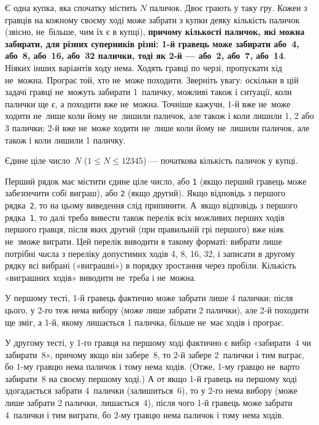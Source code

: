 ﻿Є одна купка, яка спочатку містить $N$ паличок.
Двоє грають у таку гру.
Кожен з гравців на кожному своєму ході може забрати з купки деяку кількість паличок (звісно, не~більше, чим їх є в купці), {\bf причому кількості паличок, які можна забирати, для різних суперників різні: 1-й гравець може забирати або~4, або~8, або~16, або~32 палички, тоді як 2-й --- або~2, або~7, або~14}.
Ніяких інших варіантів ходу нема. 
Ходять гравці по черзі, пропускати хід не~можна.
Програє той, хто не~може походити. Зверніть увагу: оскільки в цій задачі гравці не~можуть забирати 1~паличку, можливі також і ситуації, коли палички ще є, а походити вже не~можна. Точніше кажучи, 1-й вже не~може ходити не~лише коли йому не~лишили паличок, але також і коли лишили 1, 2 або 3 палички; 2-й вже не~може ходити не~лише коли йому не~лишили паличок, але також і коли лишили 1 паличку.

\InputFile
Єдине ціле число~$N$ ($1\leqslant N\leqslant 12345$) --- початкова кількість паличок у купці.

\OutputFile
Перший рядок має містити єдине ціле число, або \texttt{1} (якщо перший гравець може забезпечити собі виграш), або \texttt{2} (якщо др{\it у}гий).
Якщо відповідь з першого рядка~\texttt{2}, то на цьому виведення слід припинити. А~якщо відповідь з першого рядка~\texttt{1}, то далі треба вивести також перелік всіх можливих перших ходів першого гравця, після яких др{\it у}гий (при правильній грі першого) вже ні{\it я}к не~зможе виграти. Цей перелік виводити в такому форматі: вибрати лише потрібні ч{\it и}сла з переліку допустимих ходів 4, 8, 16, 32, і записати в другому рядку всі вибрані («виграшні») в порядку зростання через пробіли. Кількість «виграшних ходів» виводити не~треба і не~можна.

\Examples
\begin{example}
\end{example}

\Note
У першому тесті, 1-й гравець фактично може забрати лише 4 палички; після цього, у 2-го теж нема вибору (може лише забрати 2 палички), але 2-й походити ще зміг, а 1-й, якому лишається 1 паличка, більше не~має ходів і програ{\it є}.

У другому тесті, у 1-го гравця на першому ході фактично є вибір «забирати~4 чи забирати~8», причому якщо він забере~8, то 2-й забере 2~палички і тим в{\it и}грає, бо 1-му гравцю нема паличок і тому нема ходів. (Отже, 1-му гравцю не~варто забирати~8 на своєму першому ході.) А от якщо 1-й гравець на першому ході здогадається забрати 4~палички (залишиться~6), то у 2-го нема вибору (може лише забрати 2 палички, лишається~4), після чого 1-й гравець може забрати 4~палички і тим виграти, бо 2-му гравцю нема паличок і тому нема ходів.